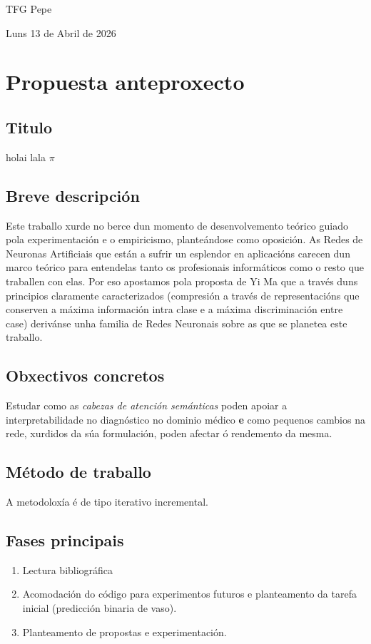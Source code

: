 \documentclass[a4paper,12pt]{article}
\begin{document}
{\centering \textsf{TFG Pepe}\par}

\vspace{0.5in}

{\huge Luns 13 de Abril de 2026}

\section{Propuesta anteproxecto}

\subsection{Titulo}
holai lala $\pi$
\subsection{Breve descripción}
Este traballo xurde no berce dun momento de desenvolvemento teórico guiado pola experimentación e o empiricismo, planteándose como oposición. As Redes de Neuronas Artificiais que están a sufrir un esplendor en aplicacións carecen dun marco teórico para entendelas tanto os profesionais informáticos como o resto que traballen con elas. Por eso apostamos pola proposta de Yi Ma que a través duns principios claramente caracterizados (compresión a través de representacións que conserven a máxima información intra clase e a máxima discriminación entre case) derivánse unha familia de Redes Neuronais sobre as que se planetea este traballo.
\subsection{Obxectivos concretos}
Estudar como as \emph{cabezas de atención semánticas} poden apoiar a interpretabilidade no diagnóstico no dominio médico  \textbf{e} como pequenos cambios na rede, xurdidos da súa formulación, poden afectar ó rendemento da mesma.
\subsection{Método de traballo}
A metodoloxía é de tipo iterativo incremental.
\subsection{Fases principais}
\begin{enumerate}
	\item Lectura bibliográfica
	\item Acomodación do código para experimentos futuros e planteamento da tarefa inicial (predicción binaria de vaso).
	\item Planteamento de propostas e experimentación.
\end{enumerate}
\end{document}
